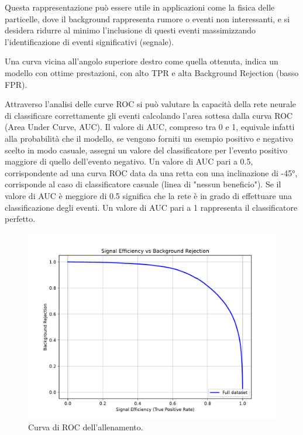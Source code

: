         Questa rappresentazione può essere utile in applicazioni come la fisica delle particelle, dove il background rappresenta rumore o eventi non interessanti, e si desidera ridurre al minimo l'inclusione di questi eventi massimizzando l'identificazione di eventi significativi (segnale).

        Una curva vicina all'angolo superiore destro come quella ottenuta, indica un modello con ottime prestazioni, con alto TPR e alta Background Rejection (basso FPR).

        Attraverso l'analisi delle curve ROC si può valutare la capacità della rete neurale di classificare correttamente gli eventi calcolando l'area sottesa dalla curva ROC (Area Under Curve, AUC). Il valore di AUC, compreso tra 0 e 1, equivale infatti alla probabilità che il modello, se vengono forniti un esempio positivo e negativo scelto in modo casuale, assegni un valore del classificatore per l'evento positivo maggiore di quello dell'evento negativo. Un valore di AUC pari a \num{0.5}, corrispondente ad una curva ROC data da una retta con una inclinazione di \ang{-45}, corrisponde al caso di classificatore casuale (linea di "nessun beneficio"). Se il valore di AUC è meggiore di \num{0.5} significa che la rete è in grado di effettuare una classificazione degli eventi. Un valore di AUC pari a \num{1} rappresenta il classificatore perfetto.
        
        
        \begin{figure}[h]
            \centering
            \includegraphics[width=0.8\linewidth]{res/fig/3-chapter/8-roc-curve.pdf}
            \caption{Curva di ROC dell'allenamento.}
            \label{fig:ROC-curve}
        \end{figure}

\newpage

